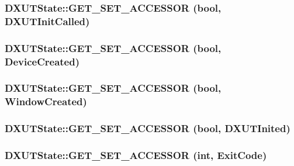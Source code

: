 \label{class_d_x_u_t_state_a5a0a83f318432262f0d1936453b5b776}
\hypertarget{class_d_x_u_t_state_af968f67a37e3c409770d52cbc5e68882}{
\subsubsection[{GET\_\-SET\_\-ACCESSOR}]{\setlength{\rightskip}{0pt plus 5cm}DXUTState::GET\_\-SET\_\-ACCESSOR (bool, \/  DXUTInitCalled)}}
\label{class_d_x_u_t_state_af968f67a37e3c409770d52cbc5e68882}
\hypertarget{class_d_x_u_t_state_a80fe40845dbc6d77ee04510e15c929c0}{
\subsubsection[{GET\_\-SET\_\-ACCESSOR}]{\setlength{\rightskip}{0pt plus 5cm}DXUTState::GET\_\-SET\_\-ACCESSOR (bool, \/  DeviceCreated)}}
\label{class_d_x_u_t_state_a80fe40845dbc6d77ee04510e15c929c0}
\hypertarget{class_d_x_u_t_state_a1c6c3de8f9aae7efa32d603d18953c13}{
\subsubsection[{GET\_\-SET\_\-ACCESSOR}]{\setlength{\rightskip}{0pt plus 5cm}DXUTState::GET\_\-SET\_\-ACCESSOR (bool, \/  WindowCreated)}}
\label{class_d_x_u_t_state_a1c6c3de8f9aae7efa32d603d18953c13}
\hypertarget{class_d_x_u_t_state_a7170f07f98ca52e76967d166e7fc5323}{
\subsubsection[{GET\_\-SET\_\-ACCESSOR}]{\setlength{\rightskip}{0pt plus 5cm}DXUTState::GET\_\-SET\_\-ACCESSOR (bool, \/  DXUTInited)}}
\label{class_d_x_u_t_state_a7170f07f98ca52e76967d166e7fc5323}
\hypertarget{class_d_x_u_t_state_a00c1bce1dc49ad37f1d7a1d517bfe2c1}{
\subsubsection[{GET\_\-SET\_\-ACCESSOR}]{\setlength{\rightskip}{0pt plus 5cm}DXUTState::GET\_\-SET\_\-ACCESSOR ({\bf int}, \/  ExitCode)}}
